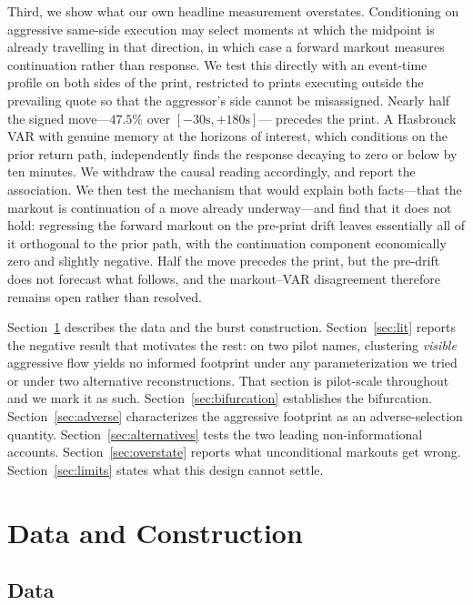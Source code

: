 \documentclass[11pt]{article}
\begin{document}
Third, we show what our own headline measurement overstates. Conditioning on aggressive
same-side execution may select moments at which the midpoint is already travelling in that
direction, in which case a forward markout measures continuation rather than response. We
test this directly with an event-time profile on both sides of the print, restricted to
prints executing outside the prevailing quote so that the aggressor's side cannot be
misassigned. Nearly half the signed move---$47.5\%$ over $[-30\text{s},+180\text{s}]$---
precedes the print. A Hasbrouck VAR with genuine memory at the horizons of interest, which
conditions on the prior return path, independently finds the response decaying to zero or
below by ten minutes. We withdraw
the causal reading accordingly, and report the association. We then test the mechanism that
would explain both facts---that the markout is continuation of a move already underway---and
find that it does not hold: regressing the forward markout on the pre-print drift leaves
essentially all of it orthogonal to the prior path, with the continuation component
economically zero and slightly negative. Half the move precedes the print, but the pre-drift
does not forecast what follows, and the markout--VAR disagreement therefore remains open
rather than resolved.

Section~\ref{sec:data} describes the data and the burst construction. Section~\ref{sec:lit}
reports the negative result that motivates the rest: on two pilot names, clustering
\emph{visible} aggressive flow yields no informed footprint under any parameterization we
tried or under two alternative reconstructions. That section is pilot-scale throughout and
we mark it as such. Section~\ref{sec:bifurcation} establishes the bifurcation.
Section~\ref{sec:adverse} characterizes the aggressive footprint as an adverse-selection
quantity. Section~\ref{sec:alternatives} tests the two leading non-informational accounts.
Section~\ref{sec:overstate} reports what unconditional markouts get wrong.
Section~\ref{sec:limits} states what this design cannot settle.

\section{Data and Construction}
\label{sec:data}

\subsection{Data}
\end{document}
